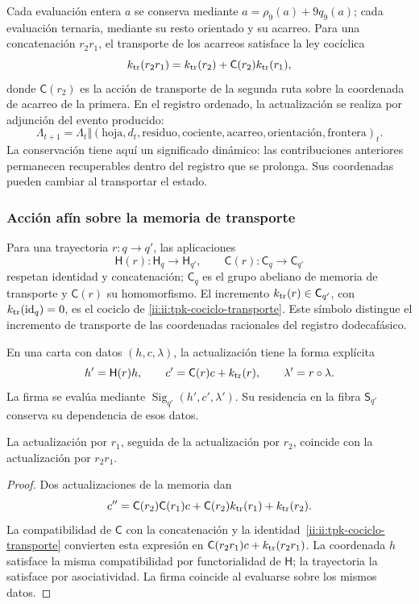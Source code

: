 Cada evaluación entera \(a\) se conserva mediante
\(a=\rho_9(a)+9q_9(a)\); cada evaluación ternaria, mediante su resto
orientado y su acarreo. Para una concatenación \(r_2r_1\), el transporte
de los acarreos satisface la ley cocíclica
\begin{equation}
 k_{\rm tr}(r_2r_1)
 =k_{\rm tr}(r_2)+\mathsf C(r_2)k_{\rm tr}(r_1),
 \label{ii:ii:tpk-cociclo-transporte}
\end{equation}
donde \(\mathsf C(r_2)\) es la acción de transporte de la segunda ruta
sobre la coordenada de acarreo de la primera. En el registro ordenado,
la actualización se realiza por adjunción del evento producido:
\[
 \Lambda_{t+1}=\Lambda_t\Vert
 (\text{hoja},d_t,\text{residuo},\text{cociente},
   \text{acarreo},\text{orientación},\text{frontera})_t.
\]
La conservación tiene aquí un significado dinámico: las contribuciones
anteriores permanecen recuperables dentro del registro que se prolonga.
Sus coordenadas pueden cambiar al transportar el estado.

\subsubsection{Acción afín sobre la memoria de transporte}

Para una trayectoria \(r:q\to q'\), las aplicaciones
\[
 \mathsf H(r):\mathsf H_q\to\mathsf H_{q'},\qquad
 \mathsf C(r):\mathsf C_q\to\mathsf C_{q'}
\]
respetan identidad y concatenación; \(\mathsf C_q\) es el grupo
abeliano de memoria de transporte y \(\mathsf C(r)\) su homomorfismo.
El incremento \(k_{\rm tr}(r)\in\mathsf C_{q'}\), con
\(k_{\rm tr}(\operatorname{id}_q)=0\), es el cociclo de
\eqref{ii:ii:tpk-cociclo-transporte}. Este símbolo distingue el incremento
de transporte de las coordenadas racionales del registro dodecafásico.

En una carta con datos \((h,c,\lambda)\), la actualización tiene la
forma explícita
\begin{equation}
 h'=\mathsf H(r)h,\qquad
 c'=\mathsf C(r)c+k_{\rm tr}(r),\qquad
 \lambda'=r\circ\lambda.
 \label{ii:ii:tpk-accion-afin}
\end{equation}
La firma se evalúa mediante
\(\operatorname{Sig}_{q'}(h',c',\lambda')\). Su residencia en la
fibra \(\mathsf S_{q'}\) conserva su dependencia de esos datos.

\begin{proposition}
\label{ii:ii:tpk-composicion-afin}
La actualización por \(r_1\), seguida de la actualización por
\(r_2\), coincide con la actualización por \(r_2r_1\).
\end{proposition}
\begin{proof}
Dos actualizaciones de la memoria dan
\[
 c''=\mathsf C(r_2)\mathsf C(r_1)c
       +\mathsf C(r_2)k_{\rm tr}(r_1)+k_{\rm tr}(r_2).
\]
La compatibilidad de \(\mathsf C\) con la concatenación y la
identidad~\eqref{ii:ii:tpk-cociclo-transporte} convierten esta expresión
en \(\mathsf C(r_2r_1)c+k_{\rm tr}(r_2r_1)\).
La coordenada \(h\) satisface la misma compatibilidad por
functorialidad de \(\mathsf H\); la trayectoria la satisface por
asociatividad. La firma coincide al evaluarse sobre los mismos datos.
\end{proof}

